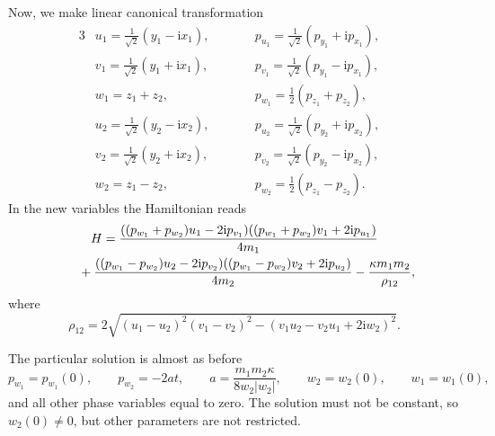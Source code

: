 Now, we make linear canonical transformation
\begin{alignat*}{3}
 &u_1 = \frac{1}{\sqrt{2}}(y_1-\mathrm{i} x_1),\qquad&&
 p_{u_1} = \frac{1}{\sqrt{2}}(p_{y_1}+\mathrm{i}p_{x_1}),&
 \\
& v_1 = \frac{1}{\sqrt{2}}(y_1+\mathrm{i} x_1),\qquad&&
 p_{v_1} =\frac{1}{\sqrt{2}}(p_{y_1}-\mathrm{i}p_{x_1}),&
 \\
& w_1 = z_1 +z_2, \qquad &&
 p_{w_1} = \frac12(p_{z_1}+p_{z_2}),&
 \\
 &u_2 = \frac{1}{\sqrt{2}}(y_2-\mathrm{i} x_2),\qquad&&
 p_{u_2} = \frac{1}{\sqrt{2}}(p_{y_2}+\mathrm{i}p_{x_2}),&
 \\
 &v_2 = \frac{1}{\sqrt{2}}(y_2+\mathrm{i} x_2),\qquad&&
 p_{v_2} =\frac{1}{\sqrt{2}}(p_{y_2}-\mathrm{i}p_{x_2}),&
 \\
& w_2 = z_1 -z_2, \qquad&&
 p_{w_2} = \frac12(p_{z_1}-p_{z_2}).&
\end{alignat*}
In the new variables the Hamiltonian reads
\begin{gather*}
 H = \frac{((p_{w_1}+p_{w_2})u_1-2\mathrm{i}p_{v_1})
 ((p_{w_1}+p_{w_2})v_1+2\mathrm{i}p_{u_1})}{4m_1}
 \\ \hphantom{ H =}
{} + \frac{((p_{w_1}-p_{w_2})u_2-2\mathrm{i}p_{v_2})
 ((p_{w_1}-p_{w_2})v_2+2\mathrm{i}p_{u_2})}{4m_2} -\frac{\kappa m_1 m_2}{\rho_{12}},
\end{gather*}
where
\begin{equation*}
 \rho_{12} = 2\sqrt{(u_1-u_2)^2(v_1-v_2)^2-(v_1 u_2 - v_2 u_1 + 2\mathrm{i}w_2)^2}.
\end{equation*}

The particular solution is almost as before
\begin{equation*}
 p_{w_1}=p_{w_1}(0),\qquad
 p_{w_2} = -2at,\qquad
 a = \frac{m_1 m_2\kappa}{8w_2|w_2|},\qquad
 w_2=w_2(0), \qquad
 w_1=w_1(0),
\end{equation*}
and all other phase variables equal to zero. The solution must not be constant, so $w_2(0)\neq 0$, but other parameters are not restricted.

